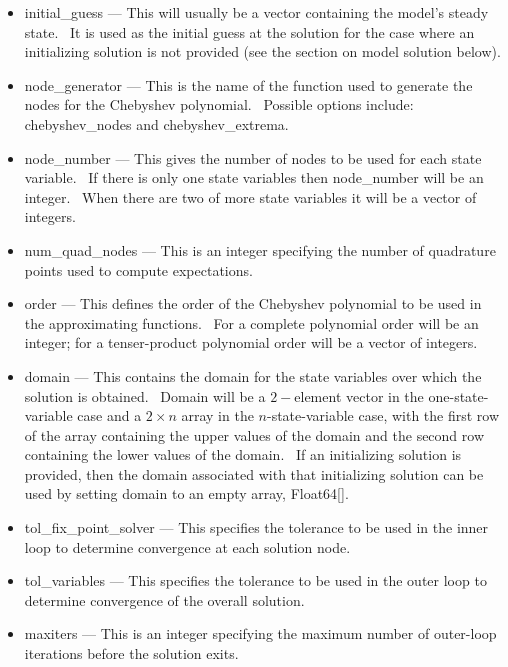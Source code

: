 \documentclass[notitlepage,11pt]{article}
\begin{document}
\begin{itemize}
\item initial\_guess --- This will usually be a vector containing the
model's steady state. \ It is used as the initial guess at the solution for
the case where an initializing solution is not provided (see the section on
model solution below).

\item node\_generator --- This is the name of the function used to generate
the nodes for the Chebyshev polynomial. \ Possible options include:
chebyshev\_nodes and chebyshev\_extrema.

\item node\_number --- This gives the number of nodes to be used for each
state variable. \ If there is only one state variables then node\_number
will be an integer. \ When there are two of more state variables it will be
a vector of integers.

\item num\_quad\_nodes --- This is an integer specifying the number of
quadrature points used to compute expectations.

\item order --- This defines the order of the Chebyshev polynomial to be
used in the approximating functions. \ For a complete polynomial order will
be an integer; for a tenser-product polynomial order will be a vector of
integers.

\item domain --- This contains the domain for the state variables over which
the solution is obtained. \ Domain will be a $2-$element vector in the
one-state-variable case and a $2\times n$ array in the $n$-state-variable
case, with the first row of the array containing the upper values of the
domain and the second row containing the lower values of the domain. \ If an
initializing solution is provided, then the domain associated with that
initializing solution can be used by setting domain to an empty array,
Float64[].

\item tol\_fix\_point\_solver --- This specifies the tolerance to be used in
the inner loop to determine convergence at each solution node.

\item tol\_variables --- This specifies the tolerance to be used in the
outer loop to determine convergence of the overall solution.

\item maxiters --- This is an integer specifying the maximum number of
outer-loop iterations before the solution exits.
\end{itemize}
\end{document}
